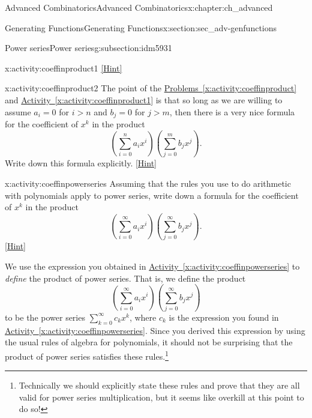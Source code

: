 \documentclass[oneside,10pt,]{book}
\numberwithin{equation}{chapter}
\begin{document}
\begin{chapterptx}{Advanced Combinatorics}{}{Advanced Combinatorics}{}{}{x:chapter:ch_advanced}
\begin{sectionptx}{Generating Functions}{}{Generating Functions}{}{}{x:section:sec_adv-genfunctions}
\begin{subsectionptx}{Power series}{}{Power series}{}{}{g:subsection:idm5931}
\begin{activity}{}{x:activity:coeffinproduct1}
\space\hspace*{0pt}\hfill{\tiny\hyperlink{g:hint:idm5964-back}{[Hint]}}\end{activity}
\begin{activity}{}{x:activity:coeffinproduct2}%
The point of the \hyperref[x:activity:coeffinproduct]{Problems~\ref{x:activity:coeffinproduct}} and \hyperref[x:activity:coeffinproduct1]{Activity~\ref{x:activity:coeffinproduct1}} is that so long as we are willing to assume \(a_i=0\) for \(i>n\) and \(b_j =0\) for \(j>m\), then there is a very nice formula for the coefficient of \(x^k\) in the product%
\begin{equation*}
\left(\sum_{i=0}^n a_ix^i\right)\left(\sum_{j=0}^m b_jx^j\right).
\end{equation*}
Write down this formula explicitly.%
\space\hspace*{0pt}\hfill{\tiny\hyperlink{g:hint:idm6007-back}{[Hint]}}\end{activity}
\begin{activity}{}{x:activity:coeffinpowerseries}%
Assuming that the rules you use to do arithmetic with polynomials apply to power series, write down a formula for the coefficient of \(x^k\) in the product%
\begin{equation*}
\left(\sum_{i=0}^\infty a_ix^i\right)\left(\sum_{j=0}^\infty
b_jx^j\right)\text{.}
\end{equation*}
%
\space\hspace*{0pt}\hfill{\tiny\hyperlink{g:hint:idm6022-back}{[Hint]}}\end{activity}
We use the expression you obtained in \hyperref[x:activity:coeffinpowerseries]{Activity~\ref{x:activity:coeffinpowerseries}} to \emph{define} the product of power series. That is, we define the product%
\begin{equation*}
\left(\sum_{i=0}^\infty a_ix^i\right)\left(\sum_{j=0}^\infty
b_jx^j\right)
\end{equation*}
to be the power series \(\sum_{k=0}^\infty c_k x^k\), where \(c_k\) is the expression you found in \hyperref[x:activity:coeffinpowerseries]{Activity~\ref{x:activity:coeffinpowerseries}}. Since you derived this expression by using the usual rules of algebra for polynomials, it should not be surprising that the product of power series satisfies these rules.\footnote{Technically we should explicitly state these rules and prove that they are all valid for power series multiplication, but it seems like overkill at this point to do so!\label{g:fn:idm6036}}%
\end{subsectionptx}

\end{sectionptx}
\end{chapterptx}
\end{document}
